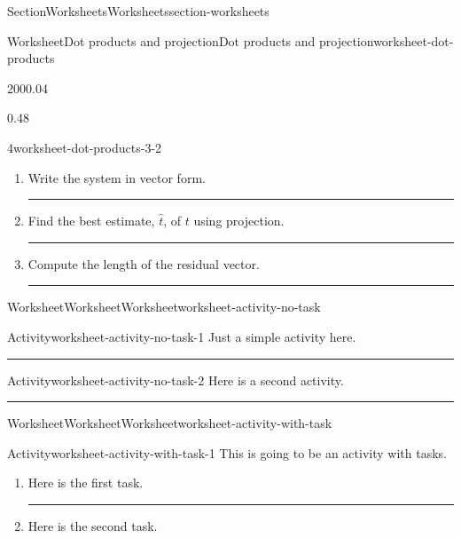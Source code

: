 \documentclass[twoside,10pt,]{article}
\newlength{\workspacestrutwidth}
\numberwithin{equation}{section}
\begin{document}
\begin{sectionptx}{Section}{Worksheets}{}{Worksheets}{}{}{section-worksheets}
\begin{worksheet-subsection}{Worksheet}{Dot products and projection}{}{Dot products and projection}{}{}{worksheet-dot-products}
\begin{sidebyside}{2}{0}{0}{0.04}
\begin{sbspanel}{0.48}
\begin{divisionexercise}{4}{}{}{worksheet-dot-products-3-2}
\begin{enumerate}[font=\bfseries,label=(\alph*),ref=\alph*]
\item{}Write the system in vector form.%
\par\rule{\workspacestrutwidth}{2in}%
\item{}Find the best estimate, \(\hat t\), of \(t\) using projection.%
\par\rule{\workspacestrutwidth}{3.9in}%
\item{}Compute the length of the residual vector.%
\par\rule{\workspacestrutwidth}{2in}%
\end{enumerate}%
\end{divisionexercise}%
\end{sbspanel}%
\end{sidebyside}%
\end{worksheet-subsection}
\restoregeometry
%
%
\typeout{************************************************}
\typeout{************************************************}
%
\begin{worksheet-subsection}{Worksheet}{Worksheet}{}{Worksheet}{}{}{worksheet-activity-no-task}
\begin{activity}{Activity}{}{worksheet-activity-no-task-1}%
Just a simple activity here.%
\par\rule{\workspacestrutwidth}{1in}%
\end{activity}%
\begin{activity}{Activity}{}{worksheet-activity-no-task-2}%
Here is a second activity.%
\par\rule{\workspacestrutwidth}{1in}%
\end{activity}%
\end{worksheet-subsection}
\restoregeometry
%
%
\typeout{************************************************}
\typeout{************************************************}
%
\begin{worksheet-subsection}{Worksheet}{Worksheet}{}{Worksheet}{}{}{worksheet-activity-with-task}
\begin{activity}{Activity}{}{worksheet-activity-with-task-1}%
This is going to be an activity with tasks.%
\begin{enumerate}[font=\bfseries,label=(\alph*),ref=\alph*]%
\item{}Here is the first task.%
\par\rule{\workspacestrutwidth}{0.75in}%
\item{}Here is the second task.%

\end{enumerate}
\end{activity}
\end{worksheet-subsection}
\end{sectionptx}
\end{document}
